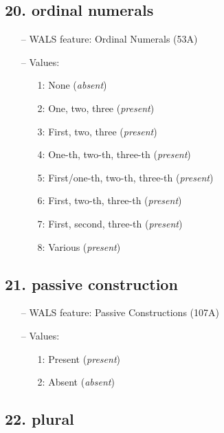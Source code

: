\subsection*{20. ordinal numerals}

\begin{itemize}
  \item[--] WALS feature: Ordinal Numerals (53A)
  \item[--] Values:
  {\small
  \begin{enumerate}
    \item[1:] None (\emph{absent})
    \item[2:] One, two, three (\emph{present})
    \item[3:] First, two, three (\emph{present})
    \item[4:] One-th, two-th, three-th (\emph{present})
    \item[5:] First/one-th, two-th, three-th (\emph{present})
    \item[6:] First, two-th, three-th (\emph{present})
    \item[7:] First, second, three-th (\emph{present})
    \item[8:] Various (\emph{present})
  \end{enumerate}
  }
\end{itemize}


\subsection*{21. passive construction}

\begin{itemize}
  \item[--] WALS feature: Passive Constructions (107A)
  \item[--] Values:
  {\small
  \begin{enumerate}
    \item[1:] Present (\emph{present})
    \item[2:] Absent (\emph{absent})
  \end{enumerate}
  }
\end{itemize}


\subsection*{22. plural}

